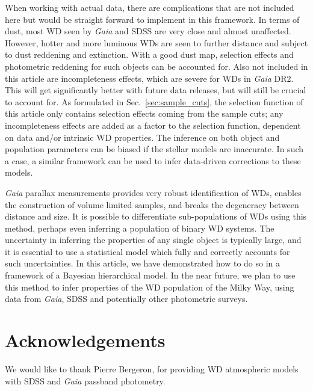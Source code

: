 \documentclass[fleqn,usenatbib]{mnras}
\begin{document}
When working with actual data, there are complications that are not included here but would be straight forward to implement in this framework. In terms of dust, most WD seen by \emph{Gaia} and SDSS are very close and almost unaffected. However, hotter and more luminous WDs are seen to further distance and subject to dust reddening and extinction. With a good dust map, selection effects and photometric reddening for such objects can be accounted for. Also not included in this article are incompleteness effects, which are severe for WDs in \emph{Gaia} DR2. This will get significantly better with future data releases, but will still be crucial to account for. As formulated in Sec.~\ref{sec:sample_cuts}, the selection function of this article only contains selection effects coming from the sample cuts; any incompleteness effects are added as a factor to the selection function, dependent on data and/or intrinsic WD properties. The inference on both object and population parameters can be biased if the stellar models are inaccurate. In such a case, a similar framework can be used to infer data-driven corrections to these models.

\emph{Gaia} parallax measurements provides very robust identification of WDs, enables the construction of volume limited samples, and breaks the degeneracy between distance and size. It is possible to differentiate sub-populations of WDs using this method, perhaps even inferring a population of binary WD systems. The uncertainty in inferring the properties of any single object is typically large, and it is essential to use a statistical model which fully and correctly accounts for such uncertainties. In this article, we have demonstrated how to do so in a framework of a Bayesian hierarchical model. In the near future, we plan to use this method to infer properties of the WD population of the Milky Way, using data from \emph{Gaia}, SDSS and potentially other photometric surveys.



\section*{Acknowledgements}

We would like to thank Pierre Bergeron, for providing WD atmospheric models with SDSS and \emph{Gaia} passband photometry.


\end{document}
